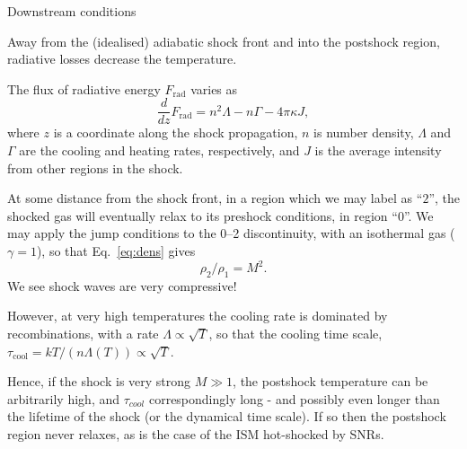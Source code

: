 \begin{frame}{Downstream  conditions}



Away from the (idealised) adiabatic shock front and into the postshock
region, radiative losses decrease the temperature. 


The flux of radiative energy $F_\mathrm{rad}$ varies as
\[ \frac{d}{dz}F_\mathrm{rad} = n^2\Lambda  - n \Gamma  - 4 \pi \kappa
J, \]
where $z$ is a coordinate along the shock propagation, $n$ is number
density, $\Lambda$ and $\Gamma$ are the cooling and heating rates,
respectively, and $J$ is the average intensity from other regions in
the shock. 


At some distance from the shock front, in a region which we may label
as ``$2$'', the shocked gas will eventually relax to its preshock
conditions, in region ``0''. We may apply the jump conditions to the
0--2 discontinuity, with an isothermal gas ($\gamma = 1$), so that
Eq.~\ref{eq:dens} gives \[ \rho_2 / \rho_1 = M^2.\] We see shock waves
are very compressive!

\end{frame}




\begin{frame}{}


However, at very high temperatures the cooling rate is dominated by
recombinations, with a rate $\Lambda \propto \sqrt{T}$, so that the
cooling time scale, $\tau_\mathrm{cool} = k T / (n \Lambda(T)) \propto
\sqrt{T}$. 

Hence, if the shock is very strong $M\gg1$, the postshock temperature
can be arbitrarily high, and $\tau_{cool}$ correspondingly long - and
possibly even longer than the lifetime of the shock (or the dynamical
time scale). If so then the postshock region never relaxes, as is the
case of the ISM hot-shocked by SNRs. 


\end{frame}





